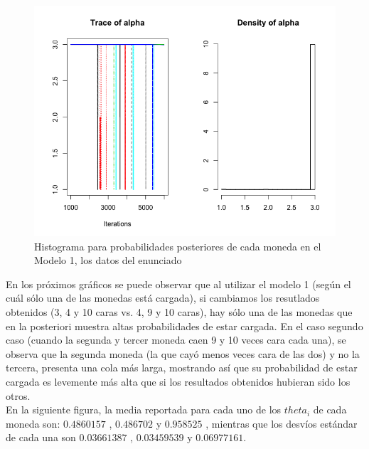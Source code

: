 \documentclass[a4paper]{article}
\begin{document}
\subsection{ }

\begin{figure}[h!]
\centering
\includegraphics[scale=0.5] {img5.png}
\caption{ Histograma para probabilidades posteriores de cada moneda en el Modelo 1,
			los datos del enunciado }
\end{figure}

En los próximos gráficos se puede observar que al utilizar el modelo 1 (según el cuál
sólo una de las monedas está cargada), si cambiamos los resutlados obtenidos (3, 4 y 10 caras vs.
4, 9 y 10 caras), hay sólo una de las monedas que en la posteriori muestra altas probabilidades de estar cargada. En el caso segundo caso (cuando la segunda y tercer moneda caen 9 y 10 veces cara cada una), se observa que la segunda moneda (la que cayó menos veces cara de las dos) y no la tercera, presenta una cola más larga, mostrando así que su probabilidad de estar cargada es levemente más alta que si los resultados obtenidos hubieran sido los otros. \\

En la siguiente figura, la media reportada para cada uno de los $theta_i$ de cada moneda son:
$0.4860157$ , $0.486702$ y $0.958525$ , mientras que los desvíos estándar de cada una son
$0.03661387$ , $0.03459539$ y $0.06977161$.
\end{document}

